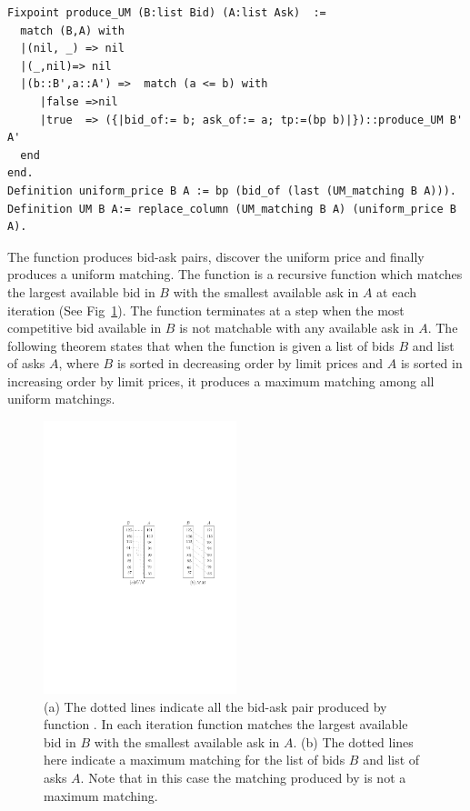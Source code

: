 \documentclass[a4paper,UKenglish,cleveref, autoref]{lipics-v2019}
\begin{document}
\begin{verbatim}
Fixpoint produce_UM (B:list Bid) (A:list Ask)  :=
  match (B,A) with
  |(nil, _) => nil
  |(_,nil)=> nil
  |(b::B',a::A') =>  match (a <= b) with
     |false =>nil
     |true  => ({|bid_of:= b; ask_of:= a; tp:=(bp b)|})::produce_UM B' A'
  end
end.
Definition uniform_price B A := bp (bid_of (last (UM_matching B A))).
Definition UM B A:= replace_column (UM_matching B A) (uniform_price B A).
\end{verbatim}


The function  produces bid-ask pairs,  discover the uniform price and finally  produces a uniform matching. The function  is a recursive function which matches the largest available bid in $B$ with the smallest available ask in $A$ at each iteration (See Fig~\ref{fig:UM}). The function   terminates at a step when the most competitive bid available in $B$ is not matchable with any available ask in $A$. The following theorem states that when the function  is given a list of bids $B$ and list of asks $A$, where $B$ is sorted in decreasing order by limit prices and $A$ is sorted in increasing order by limit prices,  it produces a maximum matching among all uniform matchings.

\begin{theorem}
\end{theorem}

\begin{figure}[h!]
\centering
\includegraphics[width=0.5\textwidth]{UM.pdf}
\caption{(a) The dotted lines indicate all the bid-ask pair  produced by function . In each iteration function   matches the largest available bid in $B$ with the smallest available ask in $A$.  (b) The dotted lines here indicate a maximum matching for the list of bids $B$ and list of asks $A$. Note that in this case the matching produced by  is not a maximum matching. }
\label{fig:UM}
\end{figure}
\end{document}
